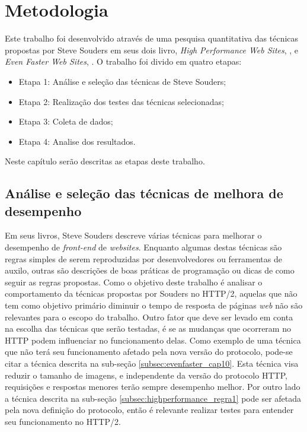 %
%

\chapter{Metodologia}

Este trabalho foi desenvolvido através de uma pesquisa quantitativa das técnicas propostas por Steve Souders em seus dois livro, \textit{High Performance Web Sites}, \cite{HighPerformance}, e \textit{Even Faster Web Sites}, \cite{EvenFaster}. O trabalho foi divido em quatro etapas:

\begin{itemize}
	\item Etapa 1: Análise e seleção das técnicas de Steve Souders;
	\item Etapa 2: Realização dos testes das técnicas selecionadas;
	\item Etapa 3: Coleta de dados;
	\item Etapa 4: Analise dos resultados.
\end{itemize}

Neste capítulo serão descritas as etapas deste trabalho.

\section{Análise e seleção das técnicas de melhora de desempenho}

Em seus livros, Steve Souders descreve várias técnicas para melhorar o desempenho de \textit{front-end} de \textit{websites}. Enquanto algumas destas técnicas são regras simples de serem reproduzidas por desenvolvedores ou ferramentas de auxilo, outras são descrições de boas práticas de programação ou dicas de como seguir as regras propostas. Como o objetivo deste trabalho é analisar o comportamento da técnicas propostas por Souders no HTTP/2, aquelas que não tem como objetivo primário diminuir o tempo de resposta de páginas \textit{web} não são relevantes para o escopo do trabalho. Outro fator que deve ser levado em conta na escolha das técnicas que serão testadas, é se as mudanças que ocorreram no HTTP podem influenciar no funcionamento delas. Como exemplo de uma técnica que não terá seu funcionamento afetado pela nova versão do protocolo, pode-se citar a técnica descrita na sub-seção \autoref{subsec:evenfaster_cap10}. Esta técnica visa reduzir o tamanho de imagens, e independente da versão do protocolo HTTP, requisições e respostas menores terão sempre desempenho melhor. Por outro lado a técnica descrita na sub-seção \autoref{subsec:highperformance_regra1} pode ser afetada pela nova definição do protocolo, então é relevante realizar testes para entender seu funcionamento no HTTP/2.

